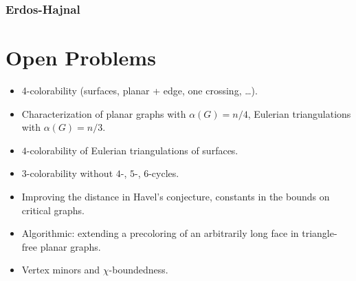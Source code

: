 \documentclass[12pt,twoside,openright,a4paper]{book}
\begin{document}
\section{Erdos-Hajnal}

\part{Open Problems}

\begin{itemize}
\item 4-colorability (surfaces, planar + edge, one crossing, \ldots).
\item Characterization of planar graphs with $\alpha(G)=n/4$, Eulerian triangulations with $\alpha(G)=n/3$.
\item $4$-colorability of Eulerian triangulations of surfaces.
\item $3$-colorability without $4$-, $5$-, $6$-cycles.
\item Improving the distance in Havel's conjecture, constants in the bounds on critical graphs.
\item Algorithmic: extending a precoloring of an arbitrarily long face in triangle-free planar graphs.
\item Vertex minors and $\chi$-boundedness.
\end{itemize}

\newpage
\pagestyle{plain}
\printindex



\end{document}
